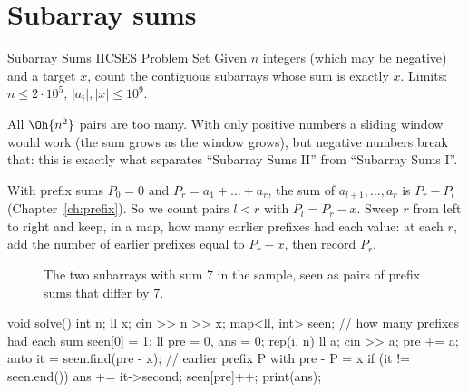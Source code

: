 \section[Subarray sums]{Subarray sums \hfill \silver}\label{wp:subarray}

\begin{statement}{Subarray Sums II}{CSES Problem Set}
Given $n$ integers (which may be negative) and a target $x$, count the contiguous subarrays whose sum is exactly $x$.
Limits: $n \le 2\cdot 10^5$, $|a_i|, |x| \le 10^9$.
\end{statement}

 All $\Oh{n^2}$ pairs are too many. With only positive numbers a sliding window would work (the sum
grows as the window grows), but negative numbers break that: this is exactly what separates ``Subarray Sums II'' from
``Subarray Sums I''.

 With prefix sums $P_0 = 0$ and $P_r = a_1 + \dots + a_r$, the sum of $a_{l+1}, \dots, a_r$ is
$P_r - P_l$ (Chapter~\ref{ch:prefix}). So we count pairs $l < r$ with $P_l = P_r - x$. Sweep $r$ from left to right and keep,
in a map, how many earlier prefixes had each value: at each $r$, add the number of earlier prefixes equal to $P_r - x$, then
record $P_r$.

\begin{figure}[H]
\centering
{}
\caption{The two subarrays with sum 7 in the sample, seen as pairs of prefix sums that differ by 7.}
\end{figure}

\begin{code}
void solve() {
    int n;
    ll x;
    cin >> n >> x;
    map<ll, int> seen;  // how many prefixes had each sum
    seen[0] = 1;
    ll pre = 0, ans = 0;
    rep(i, n) {
        ll a;
        cin >> a;
        pre += a;
        auto it = seen.find(pre - x);  // earlier prefix P with pre - P = x
        if (it != seen.end()) ans += it->second;
        seen[pre]++;
    }
    print(ans);
}
\end{code}

